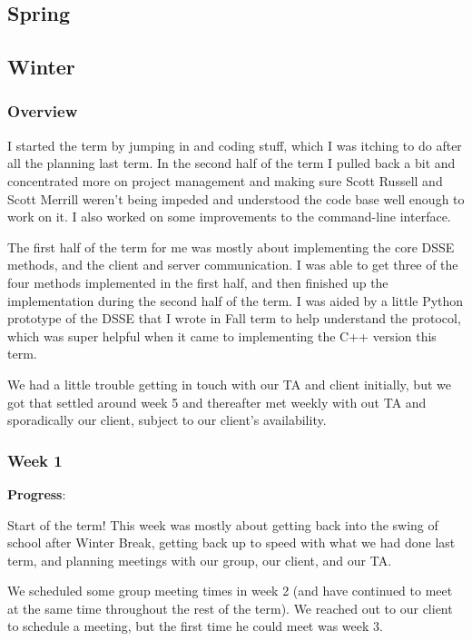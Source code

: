 \subsection{Spring}

\subsection{Winter}
\subsubsection{Overview}


I started the term by jumping in and coding stuff, which I was itching to do after all the planning last term.
In the second half of the term I pulled back a bit and concentrated more on project management and making sure
Scott Russell and Scott Merrill weren't being impeded and understood the code base well enough to work on it.
I also worked on some improvements to the command-line interface.

The first half of the term for me was mostly about implementing the core DSSE methods, and the client and server communication. I was able to get three of the four methods implemented in the first half, and then finished up the implementation during the second half of the term.  I was aided by a little Python prototype of the DSSE that I wrote in Fall term to help understand the protocol, which was super helpful when it came to implementing the C++ version this term.

We had a little trouble getting in touch with our TA and client initially, but we got that settled around week 5 and thereafter met weekly with out TA and sporadically our client, subject to our client's availability.

\subsubsection{Week 1} 

\noindent \textbf{Progress}:

Start of the term!
This week was mostly about getting back into the swing of school after Winter Break, getting back up to speed with what we had done last term, and planning meetings with our group, our client, and our TA.

We scheduled some group meeting times in week 2 (and have continued to meet at the same time throughout the rest of the term). We reached out to our client to schedule a meeting, but the first time he could meet was week 3.

